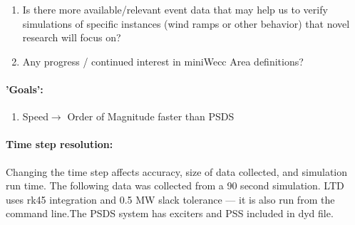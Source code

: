 \documentclass[12pt]{article}
\begin{document}
\begin{multicols}{2}
\begin{enumerate}
		\item Is there more available/relevant event data that may help us to verify simulations of specific instances (wind ramps or other behavior) that novel research will focus on? %

		\item  Any progress / continued interest in miniWecc Area definitions?

		
		
	\end{enumerate}
\paragraph{'Goals':}
	\begin{enumerate}
	\item Speed$\longrightarrow$ Order of Magnitude faster than PSDS
	\end{enumerate}

\vfill\null

\end{multicols}
\pagebreak
\paragraph{Time step resolution:} Changing the time step affects accuracy, size of data collected, and simulation run time. The following data was collected from a 90 second simulation. LTD uses rk45 integration and 0.5 MW slack tolerance --- it is also run from the command line.The PSDS system has exciters and PSS included in dyd file.
\end{document}
